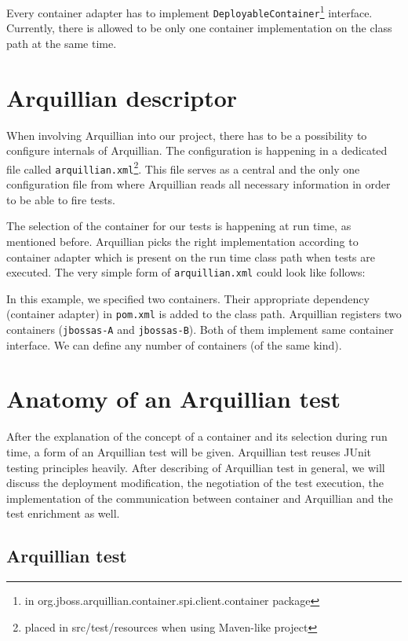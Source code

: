 \documentclass[12pt,final,oneside]{fithesis}
\begin{document}
Every container adapter has to implement \texttt{DeployableContainer}\footnote{in org.jboss.arquillian.container.spi.client.container package} interface. Currently, there is allowed to be only one container implementation on the class path at the same time.

	\section{Arquillian descriptor}

When involving Arquillian into our project, there has to be a possibility to configure internals of Arquillian. The configuration is happening in a dedicated file called \texttt{arquillian.xml}\footnote{placed in src/test/resources when using Maven-like project}. This file serves as a central and the only one configuration file from where Arquillian reads all necessary information in order to be able to fire tests.

The selection of the container for our tests is happening at run time, as mentioned before. Arquillian picks the right implementation according to container adapter which is present on the run time class path when tests are executed. The very simple form of \texttt{arquillian.xml} could look like follows:



In this example, we specified two containers. Their appropriate dependency (container adapter) in \texttt{pom.xml} is added to the class path. Arquillian registers two containers (\texttt{jbossas-A} and \texttt{jbossas-B}). Both of them implement same container interface. We can define any number of containers (of the same kind). 

	\section{Anatomy of an Arquillian test}
	
After the explanation of the concept of a container and its selection during run time, a form of an Arquillian test will be given. Arquillian test reuses JUnit testing principles heavily. After describing of Arquillian test in general, we will discuss the deployment modification, the negotiation of the test execution, the implementation of the communication between container and Arquillian and the test enrichment as well.

		\subsection{Arquillian test}
\end{document}
